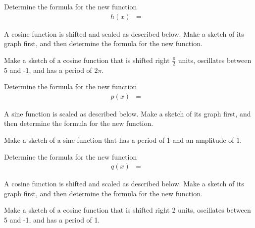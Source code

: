 \begin{problem}
\begin{subproblem}
    \vspace{-0.5em}
    \hspace{-7em}\scalebox{0.72}{}

    \item Determine the formula for the new function
      \begin{eqnarray*}
        h(x) & = &
      \end{eqnarray*}
  \end{subproblem}

\item A cosine function is shifted and scaled as described
  below. Make a sketch of its graph first, and then determine the
  formula for the new function.
  \begin{subproblem}
  \item Make a sketch of a cosine function that is shifted right
    $\frac{\pi}{2}$ units, oscillates between 5 and -1, and has a
    period of $2\pi$.

    \vspace{-0.5em}
    \hspace{-7em}\scalebox{0.72}{}

    \item Determine the formula for the new function
      \begin{eqnarray*}
        p(x) & = &
      \end{eqnarray*}
  \end{subproblem}

\clearpage

\item A sine function is scaled as described below. Make a sketch of
  its graph first, and then determine the formula for the new
  function.
  \begin{subproblem}
  \item Make a sketch of a sine function that has a period of 1 and an
    amplitude of 1.

    \vspace{-0.5em}
    \hspace{-7em}\scalebox{0.72}{}

  \item Determine the formula for the new function
    \begin{eqnarray*}
        q(x) & = &
    \end{eqnarray*}
  \end{subproblem}

\item A cosine function is shifted and scaled as described
  below. Make a sketch of its graph first, and then determine the
  formula for the new function.
  \begin{subproblem}
  \item Make a sketch of a cosine function that is shifted right
    2 units, oscillates between 5 and -1, and has a period of 1.


\end{subproblem}
\end{problem}
